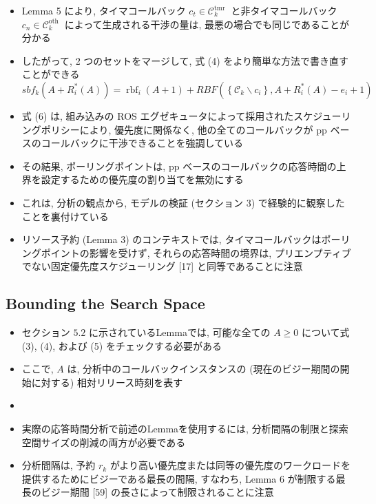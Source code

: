 \begin{frame}{}
    \begin{itemize}
        \item Lemma 5 により, タイマコールバック $c_{t} \in \mathcal{C}_{k}^{\text {tmr }}$ と非タイマコールバック $c_{n} \in \mathcal{C}_{k}^{\text {oth }}$ によって生成される干渉の量は, 最悪の場合でも同じであることが分かる
\item したがって, 2 つのセットをマージして, 式 (4) をより簡単な方法で書き直すことができる
              \begin{equation*}
                  s b f_{k}\left(A+R_{i}^{*}(A)\right)=\operatorname{rbf}_{i}(A+1)+R B F\left(\left\{\mathcal{C}_{k} \backslash c_{i}\right\}, A+R_{i}^{*}(A)-e_{i}+1\right)
              \end{equation*}
    \end{itemize}
\end{frame}

\begin{frame}{}
    \begin{itemize}
        \item 式 (6) は, 組み込みの ROS エグゼキュータによって採用されたスケジューリングポリシーにより, 優先度に関係なく, 他の全てのコールバックが pp ベースのコールバックに干渉できることを強調している
\item その結果, ポーリングポイントは, pp ベースのコールバックの応答時間の上界を設定するための優先度の割り当てを無効にする
\item これは, 分析の観点から, モデルの検証 (セクション 3) で経験的に観察したことを裏付けている
\item リソース予約 (Lemma 3) のコンテキストでは, タイマコールバックはポーリングポイントの影響を受けず, それらの応答時間の境界は, プリエンプティブでない固定優先度スケジューリング [17] と同等であることに注意
    \end{itemize}
\end{frame}


\subsection{Bounding the Search Space}
\label{ssec: bounding the search space}

\begin{frame}{}
    \begin{itemize}
        \item セクション $5.2$ に示されているLemmaでは, 可能な全ての $A \geq 0$ について式 (3), (4), および (5) をチェックする必要がある
\item ここで, $A$ は, 分析中のコールバックインスタンスの (現在のビジー期間の開始に対する) 相対リリース時刻を表す
\item
\item 実際の応答時間分析で前述のLemmaを使用するには, 分析間隔の制限と探索空間サイズの削減の両方が必要である
\item 分析間隔は, 予約 $r_{k}$ がより高い優先度または同等の優先度のワークロードを提供するためにビジーである最長の間隔, すなわち, Lemma 6 が制限する最長のビジー期間 [59] の長さによって制限されることに注意
    \end{itemize}
\end{frame}

